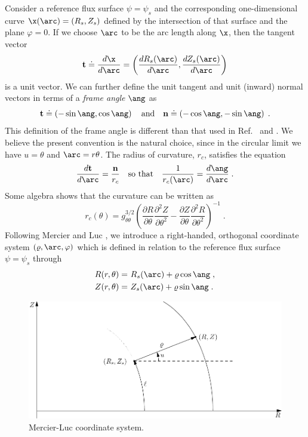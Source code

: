 Consider a reference flux surface $\psi = \psi_s$ 
and the corresponding one-dimensional curve $\x(\arc)=(R_s,Z_s)$
defined by the intersection of that surface and 
the plane $\varphi=0$.  If we choose $\arc$ to be
the arc length along $\x$, then the tangent vector 
%
\begin{equation}
{\bf t} \doteq \frac{d\x}{d\arc} = \left( 
\frac{d R_s(\arc)}{d\arc},\frac{d Z_s(\arc)}{d\arc} 
\right)
\end{equation}
%
is a unit vector.  We can further define the unit 
tangent and unit (inward) normal vectors in terms 
of a {\it frame angle} $\ang$ \cite{guggenheimer:1977} as
%
\begin{equation}
{\bf t} \doteq \left( -\sin\ang,\cos\ang \right) \quad
\mbox{and} \quad
{\bf n} \doteq \left(-\cos\ang,-\sin\ang \right) \; .
\end{equation}
%
This definition of the frame angle is different than that 
used in Ref.~\cite{miller:1998} and \cite{waltz:1999}.
We believe the present convention is the natural choice, 
since in the circular limit we have $u=\theta$ and 
$\arc=r\theta$.  The radius of curvature, $r_c$, satisfies 
the equation
%
\begin{equation}
\frac{d{\bf t}}{d\arc} = \frac{{\bf n}}{r_c} \quad
\mbox{so that}
\quad
\frac{1}{r_c(\arc)} = \frac{d \ang}{d \arc} \; . 
\end{equation}
%
Some algebra shows that the curvature can be written as
%
\begin{equation}
r_c(\theta) = g_{\theta\theta}^{3/2} \left( 
\frac{\partial R}{\partial\theta}\frac{\partial^2 Z}{\partial\theta^2}-
\frac{\partial Z}{\partial\theta}\frac{\partial^2 R}{\partial\theta^2}
\right)^{-1} \; .
\end{equation}
%
Following Mercier and Luc \cite{mercier:1974}, we introduce 
a right-handed, orthogonal coordinate system $(\varrho,\arc,\varphi)$ 
which is defined in relation to the reference flux surface 
$\psi = \psi_s$ through
%
\begin{align}
R(r,\theta) = &~R_s(\arc) + \varrho \cos\ang \; , 
 \label{eq.rml} \\
Z(r,\theta) = &~Z_s(\arc) + \varrho \sin\ang \; . 
 \label{eq.zml}
\end{align}
%
\begin{figure}
\begin{center}
\includegraphics[scale=0.9]{figures/geom2.pdf}
\caption{Mercier-Luc coordinate system.}
\label{fig.geom2}
\end{center}
\end{figure}
